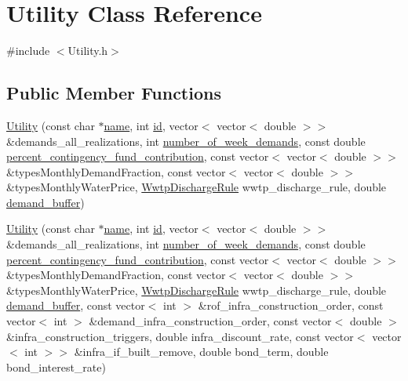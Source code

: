 \hypertarget{classUtility}{}\section{Utility Class Reference}
\label{classUtility}


{\ttfamily \#include $<$Utility.\+h$>$}

\subsection*{Public Member Functions}
\begin{DoxyCompactItemize}
\item 
\mbox{\hyperlink{classUtility_adb0e1f43122886122d2437efbc5cd756}{Utility}} (const char $\ast$\mbox{\hyperlink{classUtility_ad0ce5c179a7f5ceb46d4fcae08dbfb47}{name}}, int \mbox{\hyperlink{classUtility_ad41c4ea5c911c5000452a3371cd65d5f}{id}}, vector$<$ vector$<$ double $>$$>$ \&demands\+\_\+all\+\_\+realizations, int \mbox{\hyperlink{classUtility_a0548db3746582251082aa430db49dad0}{number\+\_\+of\+\_\+week\+\_\+demands}}, const double \mbox{\hyperlink{classUtility_a7b1a097ec188be8e7175d058b5e6596c}{percent\+\_\+contingency\+\_\+fund\+\_\+contribution}}, const vector$<$ vector$<$ double $>$$>$ \&types\+Monthly\+Demand\+Fraction, const vector$<$ vector$<$ double $>$$>$ \&types\+Monthly\+Water\+Price, \mbox{\hyperlink{classWwtpDischargeRule}{Wwtp\+Discharge\+Rule}} wwtp\+\_\+discharge\+\_\+rule, double \mbox{\hyperlink{classUtility_a4be9760339ec06e5c932890da8e566b3}{demand\+\_\+buffer}})
\item 
\mbox{\hyperlink{classUtility_aea14bf99663abb046dc24e569bfb2006}{Utility}} (const char $\ast$\mbox{\hyperlink{classUtility_ad0ce5c179a7f5ceb46d4fcae08dbfb47}{name}}, int \mbox{\hyperlink{classUtility_ad41c4ea5c911c5000452a3371cd65d5f}{id}}, vector$<$ vector$<$ double $>$$>$ \&demands\+\_\+all\+\_\+realizations, int \mbox{\hyperlink{classUtility_a0548db3746582251082aa430db49dad0}{number\+\_\+of\+\_\+week\+\_\+demands}}, const double \mbox{\hyperlink{classUtility_a7b1a097ec188be8e7175d058b5e6596c}{percent\+\_\+contingency\+\_\+fund\+\_\+contribution}}, const vector$<$ vector$<$ double $>$$>$ \&types\+Monthly\+Demand\+Fraction, const vector$<$ vector$<$ double $>$$>$ \&types\+Monthly\+Water\+Price, \mbox{\hyperlink{classWwtpDischargeRule}{Wwtp\+Discharge\+Rule}} wwtp\+\_\+discharge\+\_\+rule, double \mbox{\hyperlink{classUtility_a4be9760339ec06e5c932890da8e566b3}{demand\+\_\+buffer}}, const vector$<$ int $>$ \&rof\+\_\+infra\+\_\+construction\+\_\+order, const vector$<$ int $>$ \&demand\+\_\+infra\+\_\+construction\+\_\+order, const vector$<$ double $>$ \&infra\+\_\+construction\+\_\+triggers, double infra\+\_\+discount\+\_\+rate, const vector$<$ vector$<$ int $>$$>$ \&infra\+\_\+if\+\_\+built\+\_\+remove, double bond\+\_\+term, double bond\+\_\+interest\+\_\+rate)
$$
\end{DoxyCompactItemize}

